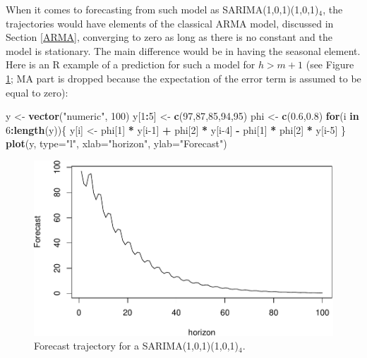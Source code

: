 \documentclass[]{book}
\newenvironment{Shaded}{\begin{snugshade}}{\end{snugshade}}
\newcommand{\ControlFlowTok}[1]{\textcolor[rgb]{0.13,0.29,0.53}{\textbf{#1}}}
\newcommand{\DataTypeTok}[1]{\textcolor[rgb]{0.13,0.29,0.53}{#1}}
\newcommand{\DecValTok}[1]{\textcolor[rgb]{0.00,0.00,0.81}{#1}}
\newcommand{\FloatTok}[1]{\textcolor[rgb]{0.00,0.00,0.81}{#1}}
\newcommand{\KeywordTok}[1]{\textcolor[rgb]{0.13,0.29,0.53}{\textbf{#1}}}
\newcommand{\NormalTok}[1]{#1}
\newcommand{\OperatorTok}[1]{\textcolor[rgb]{0.81,0.36,0.00}{\textbf{#1}}}
\newcommand{\StringTok}[1]{\textcolor[rgb]{0.31,0.60,0.02}{#1}}
\theoremstyle{definition}
\theoremstyle{definition}
\theoremstyle{definition}
\theoremstyle{definition}
\theoremstyle{remark}
\begin{document}
When it comes to forecasting from such model as SARIMA(1,0,1)(1,0,1)\(_4\), the trajectories would have elements of the classical ARMA model, discussed in Section \ref{ARMA}, converging to zero as long as there is no constant and the model is stationary. The main difference would be in having the seasonal element. Here is an R example of a prediction for such a model for \(h>m+1\) (see Figure \ref{fig:SARIMATrajectory}; MA part is dropped because the expectation of the error term is assumed to be equal to zero):

\begin{Shaded}
\begin{Highlighting}[]
\NormalTok{y <-}\StringTok{ }\KeywordTok{vector}\NormalTok{(}\StringTok{"numeric"}\NormalTok{, }\DecValTok{100}\NormalTok{)}
\NormalTok{y[}\DecValTok{1}\OperatorTok{:}\DecValTok{5}\NormalTok{] <-}\StringTok{ }\KeywordTok{c}\NormalTok{(}\DecValTok{97}\NormalTok{,}\DecValTok{87}\NormalTok{,}\DecValTok{85}\NormalTok{,}\DecValTok{94}\NormalTok{,}\DecValTok{95}\NormalTok{)}
\NormalTok{phi <-}\StringTok{ }\KeywordTok{c}\NormalTok{(}\FloatTok{0.6}\NormalTok{,}\FloatTok{0.8}\NormalTok{)}
\ControlFlowTok{for}\NormalTok{(i }\ControlFlowTok{in} \DecValTok{6}\OperatorTok{:}\KeywordTok{length}\NormalTok{(y))\{}
\NormalTok{    y[i] <-}\StringTok{ }\NormalTok{phi[}\DecValTok{1}\NormalTok{] }\OperatorTok{*}\StringTok{ }\NormalTok{y[i}\DecValTok{-1}\NormalTok{] }\OperatorTok{+}\StringTok{ }\NormalTok{phi[}\DecValTok{2}\NormalTok{] }\OperatorTok{*}\StringTok{ }\NormalTok{y[i}\DecValTok{-4}\NormalTok{] }\OperatorTok{-}
\StringTok{      }\NormalTok{phi[}\DecValTok{1}\NormalTok{] }\OperatorTok{*}\StringTok{ }\NormalTok{phi[}\DecValTok{2}\NormalTok{] }\OperatorTok{*}\StringTok{ }\NormalTok{y[i}\DecValTok{-5}\NormalTok{]}
\NormalTok{\}}
\KeywordTok{plot}\NormalTok{(y, }\DataTypeTok{type=}\StringTok{"l"}\NormalTok{, }\DataTypeTok{xlab=}\StringTok{"horizon"}\NormalTok{, }\DataTypeTok{ylab=}\StringTok{"Forecast"}\NormalTok{)}
\end{Highlighting}
\end{Shaded}

\begin{figure}
\centering
\includegraphics{Svetunkov--2022----ADAM_files/figure-latex/SARIMATrajectory-1.pdf}
\caption{\label{fig:SARIMATrajectory}Forecast trajectory for a SARIMA(1,0,1)(1,0,1)\(_4\).}
\end{figure}
\end{document}
